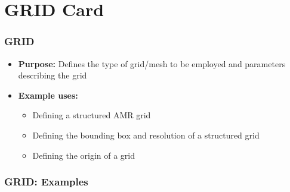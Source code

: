 \section{GRID Card}

\begin{frame}\frametitle{GRID}

\begin{itemize}
\item[] \textbf{Purpose:} Defines the type of grid/mesh to be employed and parameters describing the grid
\item[] \textbf{Example uses:}
\begin{itemize}
  \item Defining a structured AMR grid
  \item Defining the bounding box and resolution of a structured grid
  \item Defining the origin of a grid
\end{itemize}
\end{itemize}

\end{frame}

\begin{frame}[fragile]\frametitle{GRID: Examples}

\end{frame}
